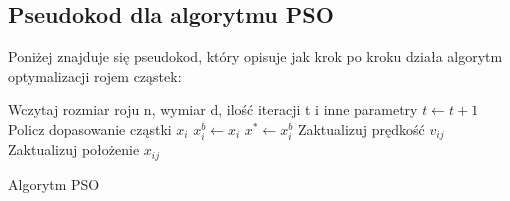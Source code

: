 \subsection{Pseudokod dla algorytmu PSO}
Poniżej znajduje się pseudokod, który opisuje jak krok po kroku działa algorytm optymalizacji rojem cząstek:
\newpage
\begin{algorithm}[h]
	Wczytaj rozmiar roju n, wymiar d, ilość iteracji t i inne parametry\;
 	{
 		$t\leftarrow t+1$\;
  		{
  			Policz dopasowanie cząstki $x_i$\;
  			{
  				$x_i^b \leftarrow x_i$
  			}
  			{
  				$x^* \leftarrow x_i^b$
  			}
  		}
  		{
  			{
  				Zaktualizuj prędkość $v_{ij}$\;
  				Zaktualizuj położenie $x_{ij}$\;
  			}
  		}
 	}
 	\caption{Algorytm PSO}
\end{algorithm}

